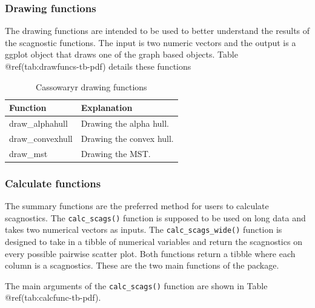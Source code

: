\hypertarget{drawing-functions}{%
\subsubsection{Drawing functions}\label{drawing-functions}}

The drawing functions are intended to be used to better understand the
results of the scagnostic functions. The input is two numeric vectors
and the output is a ggplot object that draws one of the graph based
objects. Table @ref(tab:drawfuncs-tb-pdf) details these functions

\begin{Schunk}
\begin{table}

\caption{\label{tab:drawfuncs-tb-pdf}Cassowaryr drawing functions}
\centering
\begin{tabular}[t]{>{\raggedright\arraybackslash}p{3cm}l}
\toprule
Function & Explanation\\
\midrule
draw\_alphahull & Drawing the alpha hull.\\
draw\_convexhull & Drawing the convex hull.\\
draw\_mst & Drawing the MST.\\
\bottomrule
\end{tabular}
\end{table}

\end{Schunk}

\hypertarget{calculate-functions}{%
\subsubsection{Calculate functions}\label{calculate-functions}}

The summary functions are the preferred method for users to calculate
scagnostics. The \texttt{calc\_scags()} function is supposed to be used
on long data and takes two numerical vectors as inputs. The
\texttt{calc\_scags\_wide()} function is designed to take in a tibble of
numerical variables and return the scagnostics on every possible
pairwise scatter plot. Both functions return a tibble where each column
is a scagnostics. These are the two main functions of the package.

The main arguments of the \texttt{calc\_scags()} function are shown in
Table @ref(tab:calcfunc-tb-pdf).

